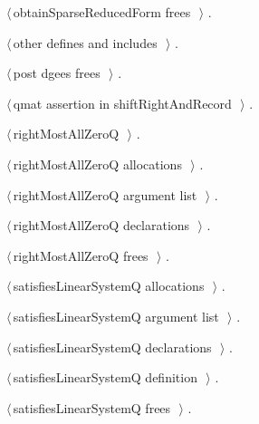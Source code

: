 \documentclass{article}
\begin{document}
{\begin{list}{}{\setlength{\itemsep}{-\parsep}\setlength{\itemindent}{-\leftmargin}}
\item $\langle\,$obtainSparseReducedForm frees\nobreak\ {\footnotesize {}}$\,\rangle$ {\footnotesize {\NWtxtRefIn} .}
\item $\langle\,$other defines and includes\nobreak\ {\footnotesize {}}$\,\rangle$ {\footnotesize {\NWtxtRefIn} .}
\item $\langle\,$post dgees frees\nobreak\ {\footnotesize {}}$\,\rangle$ {\footnotesize {\NWtxtRefIn} .}
\item $\langle\,$qmat assertion in shiftRightAndRecord\nobreak\ {\footnotesize {}}$\,\rangle$ {\footnotesize {\NWtxtRefIn} .}
\item $\langle\,$rightMostAllZeroQ\nobreak\ {\footnotesize {}}$\,\rangle$ {\footnotesize {\NWtxtRefIn} .}
\item $\langle\,$rightMostAllZeroQ allocations\nobreak\ {\footnotesize {}}$\,\rangle$ {\footnotesize {\NWtxtRefIn} .}
\item $\langle\,$rightMostAllZeroQ argument list\nobreak\ {\footnotesize {}}$\,\rangle$ {\footnotesize {\NWtxtRefIn} .}
\item $\langle\,$rightMostAllZeroQ declarations\nobreak\ {\footnotesize {}}$\,\rangle$ {\footnotesize {\NWtxtRefIn} .}
\item $\langle\,$rightMostAllZeroQ frees\nobreak\ {\footnotesize {}}$\,\rangle$ {\footnotesize {\NWtxtRefIn} .}
\item $\langle\,$satisfiesLinearSystemQ allocations\nobreak\ {\footnotesize {}}$\,\rangle$ {\footnotesize {\NWtxtRefIn} .}
\item $\langle\,$satisfiesLinearSystemQ argument list\nobreak\ {\footnotesize {}}$\,\rangle$ {\footnotesize {\NWtxtRefIn} .}
\item $\langle\,$satisfiesLinearSystemQ declarations\nobreak\ {\footnotesize {}}$\,\rangle$ {\footnotesize {\NWtxtRefIn} .}
\item $\langle\,$satisfiesLinearSystemQ definition\nobreak\ {\footnotesize {}}$\,\rangle$ {\footnotesize {\NWtxtRefIn} .}
\item $\langle\,$satisfiesLinearSystemQ frees\nobreak\ {\footnotesize {}}$\,\rangle$ {\footnotesize {\NWtxtRefIn} .}

\end{list}}
\end{document}
